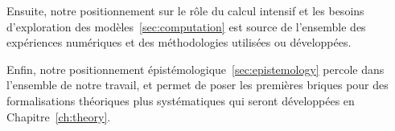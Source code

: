 Ensuite, notre positionnement sur le rôle du calcul intensif et les besoins d'exploration des modèles~\ref{sec:computation} est source de l'ensemble des expériences numériques et des méthodologies utilisées ou développées.


Enfin, notre positionnement épistémologique~\ref{sec:epistemology} percole dans l'ensemble de notre travail, et permet de poser les premières briques pour des formalisations théoriques plus systématiques qui seront développées en Chapitre~\ref{ch:theory}.


